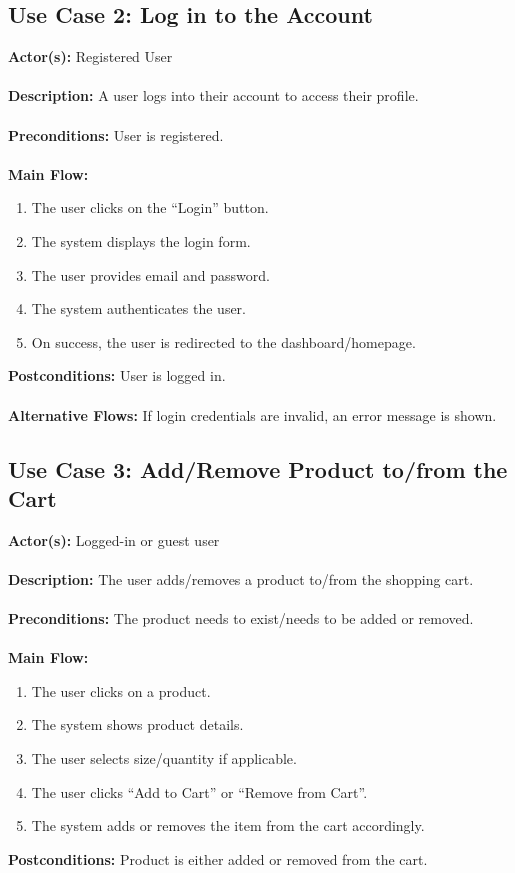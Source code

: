 \documentclass[a4paper,12pt]{article}
\begin{document}
    \subsection*{Use Case 2: Log in to the Account}
	\textbf{Actor(s):} Registered User \\ \\
	\textbf{Description:} A user logs into their account to access their profile. \\ \\
	\textbf{Preconditions:} User is registered. \\ \\
	\textbf{Main Flow:}
	\begin{enumerate}
  		\item The user clicks on the ``Login'' button.
  		\item The system displays the login form.
  		\item The user provides email and password.
  		\item The system authenticates the user.
  		\item On success, the user is redirected to the dashboard/homepage.
	\end{enumerate}
	\textbf{Postconditions:} User is logged in. \\ \\
	\textbf{Alternative Flows:} If login credentials are invalid, an error message is shown.


	\subsection*{Use Case 3: Add/Remove Product to/from the Cart}
	\textbf{Actor(s):} Logged-in or guest user \\ \\
	\textbf{Description:} The user adds/removes a product to/from the shopping cart. \\ \\
	\textbf{Preconditions:} The product needs to exist/needs to be added or removed. \\ \\
	\textbf{Main Flow:}
	\begin{enumerate}
  		\item The user clicks on a product.
  		\item The system shows product details.
  		\item The user selects size/quantity if applicable.
  		\item The user clicks ``Add to Cart'' or ``Remove from Cart''.
  		\item The system adds or removes the item from the cart accordingly.
	\end{enumerate}
	\textbf{Postconditions:} Product is either added or removed from the cart.
\end{document}
